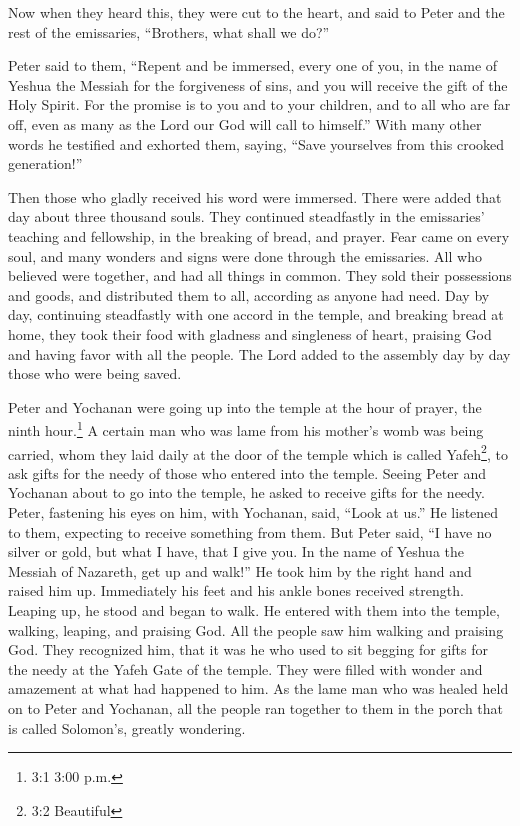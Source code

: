 \myverse{}Now when they heard this, they were cut to the heart, and said
to Peter and the rest of the emissaries, “Brothers, what shall we do?”

\myverse{}Peter said to them, “Repent and be immersed, every one of you,
in the name of Yeshua the Messiah for the forgiveness of sins, and you will receive the gift of the Holy
Spirit.
\myverse{}For the promise is to you and to your children, and to all who are far off,
even as many as the Lord our God will call to himself.”
\myverse{}With many other words he testified and exhorted them, saying, “Save yourselves
from this crooked generation!”

\myverse{}Then those who gladly received his word were immersed. There
were added that day about three thousand souls.
\myverse{}They continued steadfastly in the emissaries’ teaching and fellowship, in
the breaking of bread, and prayer.
\myverse{}Fear came on every soul, and many wonders and signs were done through the
emissaries.
\myverse{}All who believed were together, and had all things in common.
\myverse{}They sold their possessions and goods, and distributed them to all, according
as anyone had need.
\myverse{}Day by day, continuing steadfastly with one accord in the temple, and breaking
bread at home, they took their food with gladness and singleness of heart,
\myverse{}praising God and having favor with all the people. The Lord added to the assembly
day by day those who were being saved.


\mychapter{} \myverse*{}Peter and Yochanan were going up into the temple at the hour of
prayer, the ninth hour.\footnote{3:1 3:00 p.m.}
\myverse{}A certain man who was lame from his mother’s womb was being carried, whom they
laid daily at the door of the temple which is called Yafeh\footnote{3:2 Beautiful}, to ask gifts for
the needy of those who entered into the temple.
\myverse{}Seeing Peter and Yochanan about to go into the temple, he asked to receive gifts
for the needy.
\myverse{}Peter, fastening his eyes on him, with Yochanan, said, “Look at us.”
\myverse{}He listened to them, expecting to receive something from them.
\myverse{}But Peter said, “I have no silver or gold, but what I have, that I give you.
In the name of Yeshua the Messiah of Nazareth, get up and walk!”
\myverse{}He took him by the right hand and raised him up. Immediately his feet and his
ankle bones received strength.
\myverse{}Leaping up, he stood and began to walk. He entered with them into the temple,
walking, leaping, and praising God.
\myverse{}All the people saw him walking and praising God.
\myverse{}They recognized him, that it was he who used to sit begging for gifts for
the needy at the Yafeh Gate of the temple. They were filled with wonder and amazement at what had happened
to him.
\myverse{}As the lame man who was healed held on to Peter and Yochanan, all the people
ran together to them in the porch that is called Solomon’s, greatly wondering.

